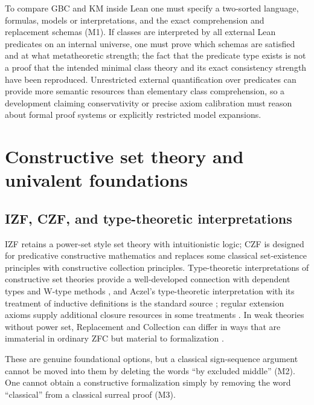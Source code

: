 \documentclass[11pt,letterpaper]{article}
\numberwithin{equation}{section}
\theoremstyle{definition}
\theoremstyle{remark}
\begin{document}
To compare GBC and KM inside Lean one must specify a two-sorted language,
formulas, models or interpretations, and the exact comprehension and replacement
schemas (M1). If classes are interpreted by all external Lean predicates on an
internal universe, one must prove which schemas are satisfied and at what
metatheoretic strength; the fact that the predicate type exists is not a proof
that the intended minimal class theory and its exact consistency strength have
been reproduced. Unrestricted external quantification over predicates can
provide more semantic resources than elementary class comprehension, so a
development claiming conservativity or precise axiom calibration must reason
about formal proof systems or explicitly restricted model expansions.

\section{Constructive set theory and univalent foundations}
\label{found:sec:constructive}

\subsection{IZF, CZF, and type-theoretic interpretations}
\label{found:sub:izf}
IZF retains a power-set style set theory with intuitionistic logic; CZF is
designed for predicative constructive mathematics and replaces some classical
set-existence principles with constructive collection principles. Type-theoretic
interpretations of constructive set theories provide a well-developed connection
with dependent types and W-type methods \cite{found:GambinoAczel}, and Aczel's
type-theoretic interpretation with its treatment of inductive definitions is the
standard source \cite{found:Aczel}; regular extension axioms supply additional
closure resources in some treatments \cite{found:Rathjen}. In weak theories
without power set, Replacement and Collection can differ in ways that are
immaterial in ordinary ZFC but material to formalization
\cite{found:ZFCminus}.

These are genuine foundational options, but a classical sign-sequence argument
cannot be moved into them by deleting the words ``by excluded middle'' (M2). One
cannot obtain a constructive formalization simply by removing the word
``classical'' from a classical surreal proof (M3).
\end{document}
